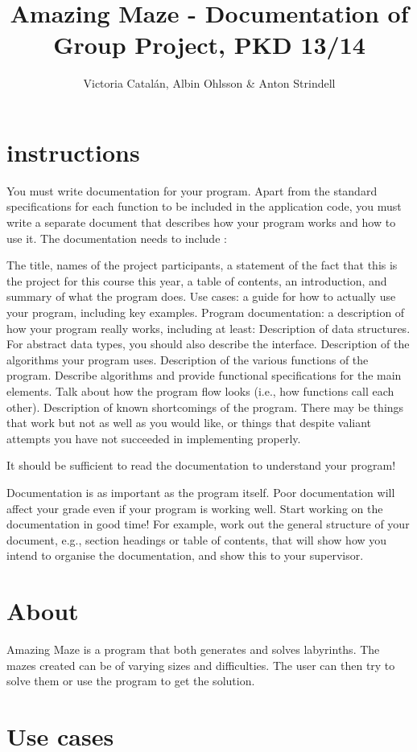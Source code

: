 \documentclass[12pt, a4paper]{article}
\begin{document}
\title{Amazing Maze - Documentation of Group Project, PKD 13/14}
\author{Victoria Catalán, Albin Ohlsson \& Anton Strindell}
\maketitle
\tableofcontents
\lstset{breaklines=true }
\lstset{
	language=ML,
	basicstyle=\footnotesize\ttfamily,
}

\section{instructions}
You must write documentation for your program. Apart from the standard specifications for each function to be included in the application code, you must write a separate document that describes how your program works and how to use it. 
The documentation needs to include :

    The title, names of the project participants, a statement of the fact that this is the project for this course this year, a table of contents, an introduction, and summary of what the program does.
    Use cases: a guide for how to actually use your program, including key examples.
    Program documentation: a description of how your program really works, including at least: 
        Description of data structures. For abstract data types, you should also describe the interface.
        Description of the algorithms your program uses.
        Description of the various functions of the program. Describe algorithms and provide functional specifications for the main elements. Talk about how the program flow looks (i.e., how functions call each other).
    Description of known shortcomings of the program. There may be things that work but not as well as you would like, or things that despite valiant attempts you have not succeeded in implementing properly.

It should be sufficient to read the documentation to understand your program!

Documentation is as important as the program itself. Poor documentation will affect your grade even if your program is working well. Start working on the documentation in good time! For example, work out the general structure of your document, e.g., section headings or table of contents, that will show how you intend to organise the documentation, and show this to your supervisor.

\section{About}
Amazing Maze is a program that both generates and solves labyrinths. The mazes created can be of varying sizes and difficulties. The user can then try to solve them or use the program to get the solution.

\section{Use cases}
\end{document}
